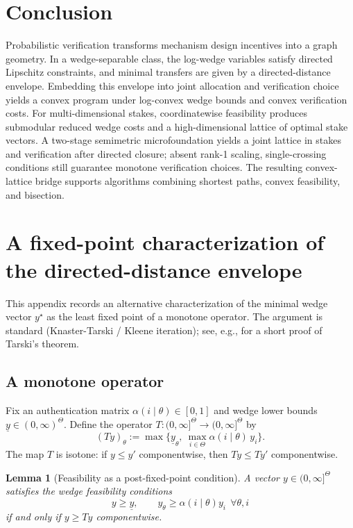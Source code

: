 \documentclass[final,3p,times]{elsarticle}
\theoremstyle{plain}
\newtheorem{lemma}{Lemma}
\theoremstyle{definition}
\newcommand{\1}{\mathbbm{1}}
\newcommand{\ThetaSet}{\Theta}
\begin{document}
\section{Conclusion}

Probabilistic verification transforms mechanism design incentives into a graph geometry. In a wedge-separable class, the log-wedge variables satisfy directed Lipschitz constraints, and minimal transfers are given by a directed-distance envelope. Embedding this envelope into joint allocation and verification choice yields a convex program under log-convex wedge bounds and convex verification costs. For multi-dimensional stakes, coordinatewise feasibility produces submodular reduced wedge costs and a high-dimensional lattice of optimal stake vectors. A two-stage semimetric microfoundation yields a joint lattice in stakes and verification after directed closure; absent rank-1 scaling, single-crossing conditions still guarantee monotone verification choices. The resulting convex-lattice bridge supports algorithms combining shortest paths, convex feasibility, and bisection.

\appendix
\section{A fixed-point characterization of the directed-distance envelope}\label{app:fixedpoint}

This appendix records an alternative characterization of the minimal wedge vector $y^\star$ as the least fixed point of a monotone operator.
The argument is standard (Knaster-Tarski / Kleene iteration); see, e.g., \citet{Echenique2005} for a short proof of Tarski's theorem.

\subsection{A monotone operator}

Fix an authentication matrix $\alpha(i\mid\theta)\in[0,1]$ and wedge lower bounds $\underline y\in(0,\infty)^{\ThetaSet}$.
Define the operator $T:(0,\infty]^{\ThetaSet}\to(0,\infty]^{\ThetaSet}$ by
\begin{equation}\label{eq:Tk}
(Ty)_\theta := \max\Big\{\underline y_\theta,\ \max_{i\in\ThetaSet}\alpha(i\mid\theta)\,y_i\Big\}.
\end{equation}
The map $T$ is isotone: if $y\le y'$ componentwise, then $Ty\le Ty'$ componentwise.

\begin{lemma}[Feasibility as a post-fixed-point condition]\label{lem:postfixed}
A vector $y\in(0,\infty]^{\ThetaSet}$ satisfies the wedge feasibility conditions
\[
y\ge \underline y,\qquad y_\theta\ge \alpha(i\mid\theta)y_i\ \ \forall \theta,i
\]
if and only if $y\ge Ty$ componentwise.
\end{lemma}
\end{document}
